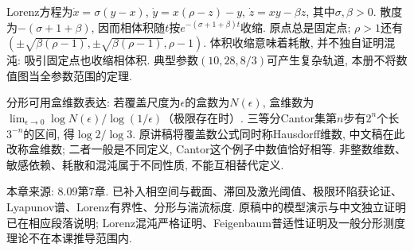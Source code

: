 Lorenz方程为$\dot x=\sigma(y-x)$, $\dot y=x(\rho-z)-y$, $\dot z=xy-\beta z$, 其中$\sigma,\beta>0$. 散度为$-(\sigma+1+\beta)$, 因而相体积随$t$按$e^{-(\sigma+1+\beta)t}$收缩. 原点总是固定点; $\rho>1$还有$(\pm\sqrt{\beta(\rho-1)},\pm\sqrt{\beta(\rho-1)},\rho-1)$. 体积收缩意味着耗散, 并不独自证明混沌: 吸引固定点也收缩相体积. 典型参数$(10,28,8/3)$可产生复杂轨道, 本册不将数值图当全参数范围的定理.

分形可用盒维数表达: 若覆盖尺度为$\epsilon$的盒数为$N(\epsilon)$, 盒维数为$\lim_{\epsilon\to0}\log N(\epsilon)/\log(1/\epsilon)$（极限存在时）. 三等分Cantor集第$n$步有$2^n$个长$3^{-n}$的区间, 得$\log2/\log3$. 原讲稿将覆盖数公式同时称Hausdorff维数, 中文稿在此改称盒维数; 二者一般是不同定义, Cantor这个例子中数值恰好相等. 非整数维数、敏感依赖、耗散和混沌属于不同性质, 不能互相替代定义.



本章来源: 8.09第7章. 已补入相空间与截面、滞回及激光阈值、极限环陷获论证、Lyapunov谱、Lorenz有界性、分形与湍流标度. 原稿中的模型演示与中文独立证明已在相应段落说明; Lorenz混沌严格证明、Feigenbaum普适性证明及一般分形测度理论不在本课推导范围内.
